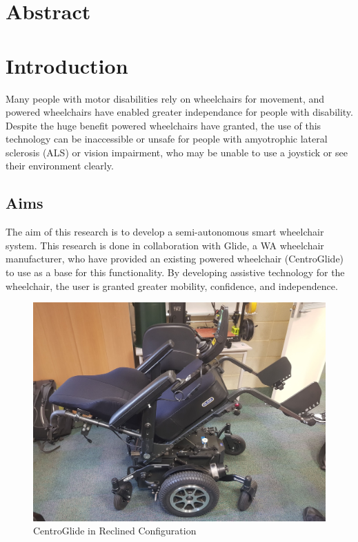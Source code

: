 \documentclass[12pt]{article}
\begin{document}

\thispagestyle{empty}
\pagebreak

\section*{Abstract}
\pagebreak

\renewcommand{\contentsname}{Table of Contents}
\tableofcontents
\listoffigures
\listoftables
\pagebreak





\section{Introduction}
Many people with motor disabilities rely on wheelchairs for movement, and
powered wheelchairs have enabled greater independance for people with disability.
Despite the huge benefit powered wheelchairs have granted,
the use of this technology can be inaccessible or unsafe for people
with amyotrophic lateral sclerosis (ALS) or vision impairment,
who may be unable to use a joystick or see their environment clearly.


\subsection{Aims}
The aim of this research is to develop a semi-autonomous smart wheelchair system.
This research is done in collaboration with Glide, a WA wheelchair manufacturer,
who have provided an existing powered wheelchair (CentroGlide) to use as a base
for this functionality. By developing assistive technology for the wheelchair,
the user is granted greater mobility, confidence, and independence.

\begin{figure}[H]
    \centering
    \includegraphics[width=0.6\linewidth]{images/wheelchair_reclined.jpeg}
    \caption{CentroGlide in Reclined Configuration}
    \label{fig:wheelchair_reclined}
\end{figure}
\end{document}
